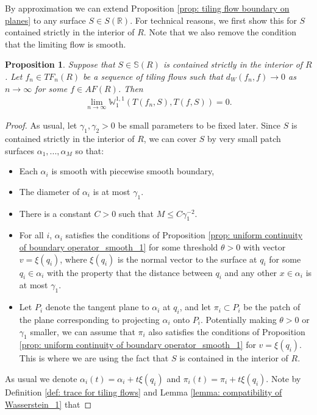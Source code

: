 \documentclass[11pt]{article}
\newtheorem{prop}[thm]{Proposition}
\theoremstyle{remark}
\theoremstyle{definition}
\newcommand{\m}[1]{\mathbb{#1}}
\begin{document}
By approximation we can extend Proposition \ref{prop: tiling flow boundary on planes} to any surface $S\in S(\m R)$. For technical reasons, we first show this for $S$ contained strictly in the interior of $R$. Note that we also remove the condition that the limiting flow is smooth.
\begin{prop}\label{prop: trace for interior surfaces}
Suppose that $S\in \m S(R)$ is contained strictly in the interior of $R$. Let $f_n\in TF_n(R)$ be a sequence of tiling flows such that $d_W(f_n,f)\to0$ as $n\to \infty$ for some $f\in AF(R)$. Then 
\begin{align*}
    \lim_{n\to\infty} \m W_1^{1,1}(T(f_n,S),T(f,S)) = 0.
\end{align*}
\end{prop}
\begin{proof}
    As usual, let $\gamma_1,\gamma_2>0$ be small parameters to be fixed later. Since $S$ is contained strictly in the interior of $R$, we can cover $S$ by very small patch surfaces $\alpha_1,...,\alpha_M$ so that:
    \begin{itemize}
        \item Each $\alpha_i$ is smooth with piecewise smooth boundary,
        \item The diameter of $\alpha_i$ is at most $\gamma_1$.
        \item There is a constant $C>0$ such that $M\leq C \gamma_1^{-2}$.
        \item For all $i$, $\alpha_i$ satisfies the conditions of Proposition \ref{prop: uniform continuity of boundary operator_smooth_1} for some threshold $\theta>0$ with vector $v= \xi(q_i)$, where $\xi(q_i)$ is the normal vector to the surface at $q_i$ for some $q_i\in \alpha_i$ with the property that the distance between $q_i$ and any other $x\in \alpha_i$ is at most $\gamma_1$.
        \item Let $P_i$ denote the tangent plane to $\alpha_i$ at $q_i$, and let $\pi_i\subset P_i$ be the patch of the plane corresponding to projecting $\alpha_i$ onto $P_i$. Potentially making $\theta>0$ or $\gamma_1$ smaller, we can assume that $\pi_i$ also satisfies the conditions of Proposition \ref{prop: uniform continuity of boundary operator_smooth_1} for $v=\xi(q_i)$. This is where we are using the fact that $S$ is contained in the interior of $R$.
    \end{itemize}
    As usual we denote $\alpha_i(t) = \alpha_i + t \xi(q_i)$ and $\pi_i(t) = \pi_i + t \xi(q_i)$.
    Note by Definition \ref{def: trace for tiling flows} and Lemma \ref{lemma: compatibility of Wasserstein_1} that 

\end{proof}
\end{document}
